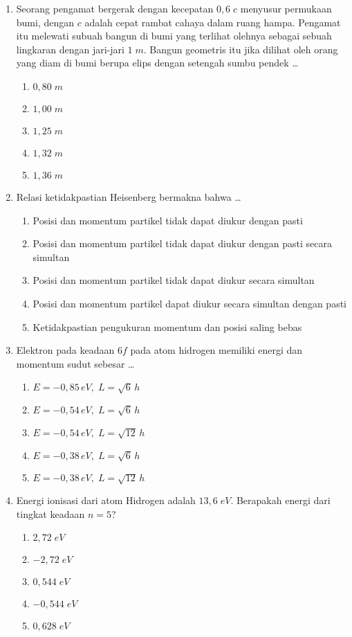 \documentclass[A4,12PT, english, twocolumn]{journal}
\begin{document}
\begin{enumerate}
\item Seorang pengamat bergerak dengan kecepatan $0,6 \; c$ menyusur permukaan bumi, dengan $c$ adalah cepat rambat cahaya dalam ruang hampa. Pengamat itu melewati subuah bangun di bumi yang terlihat olehnya sebagai sebuah lingkaran dengan jari-jari $1 \; m$. Bangun geometris itu jika dilihat oleh orang yang diam di bumi berupa elips dengan setengah sumbu pendek \dots
    \begin{enumerate}
        \item $0,80 \; m$
        \item $1,00 \; m$
        \item $1,25 \; m$
        \item $1,32 \; m$
        \item $1,36 \; m$
    \end{enumerate}

\item Relasi ketidakpastian Heisenberg bermakna bahwa \dots
    \begin{enumerate}
        \item Posisi dan momentum partikel tidak dapat diukur dengan pasti
        \item Posisi dan momentum partikel tidak dapat diukur dengan pasti secara simultan
        \item Posisi dan momentum partikel tidak dapat diukur secara simultan
        \item Posisi dan momentum partikel dapat diukur secara simultan dengan pasti
        \item Ketidakpastian pengukuran momentum dan posisi saling bebas
    \end{enumerate}

\item Elektron pada keadaan $6f$ pada atom hidrogen memiliki energi dan momentum sudut sebesar \dots
    \begin{enumerate}
        \item $E=-0,85 \, eV, \; L=\sqrt{6} \, h$
        \item $E=-0,54 \, eV, \; L=\sqrt{6} \, h$
        \item $E=-0,54 \, eV, \; L=\sqrt{12} \, h$
        \item $E=-0,38 \, eV, \; L=\sqrt{6} \, h$
        \item $E=-0,38 \, eV, \; L=\sqrt{12} \, h$
    \end{enumerate}

\item Energi ionisasi dari atom Hidrogen adalah $13,6 \; eV$. Berapakah energi dari tingkat keadaan $n=5$?
    \begin{enumerate}
        \item $2,72 \; eV$
        \item $-2,72 \; eV$
        \item $0,544 \; eV$
        \item $-0,544 \; eV$
        \item $0,628 \; eV$
    \end{enumerate}

\end{enumerate}
\end{document}

